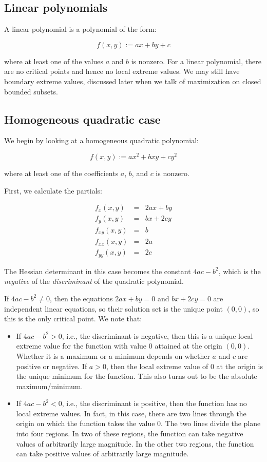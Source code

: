 \documentclass[10pt]{amsart}
\begin{document}
\subsection{Linear polynomials}

A linear polynomial is a polynomial of the form:

$$f(x,y) := ax + by + c$$

where at least one of the values $a$ and $b$ is nonzero. For a linear
polynomial, there are no critical points and hence no local extreme
values. We may still have boundary extreme values, discussed later
when we talk of maximization on closed bounded subsets.

\subsection{Homogeneous quadratic case}

We begin by looking at a homogeneous quadratic polynomial:

$$f(x,y) := ax^2 + bxy + cy^2$$

where at least one of the coefficients $a$, $b$, and $c$ is nonzero.

First, we calculate the partials:

\begin{eqnarray*}
  f_x(x,y) & = & 2ax + by \\
  f_y(x,y) & = & bx + 2cy \\
  f_{xy}(x,y)&=& b\\
  f_{xx}(x,y)&=& 2a \\
  f_{yy}(x,y)&=& 2c
\end{eqnarray*}

The Hessian determinant in this case becomes the constant $4ac - b^2$,
which is the {\em negative} of the {\em discriminant} of the quadratic
polynomial.

If $4ac - b^2 \ne 0$, then the equations $2ax + by = 0$ and $bx + 2cy
= 0$ are independent linear equations, so their solution set is the
unique point $(0,0)$, so this is the only critical point. We note that:

\begin{itemize}
\item If $4ac - b^2 > 0$, i.e., the discriminant is negative, then
  this is a unique local extreme value for the function with value $0$
  attained at the origin $(0,0)$. Whether it is a maximum or a minimum
  depends on whether $a$ and $c$ are positive or negative. If $a > 0$,
  then the local extreme value of $0$ at the origin is the unique
  minimum for the function. This also turns out to be the absolute
  maximum/minimum.
\item If $4ac - b^2 < 0$, i.e., the discriminant is positive, then the
  function has no local extreme values. In fact, in this case, there
  are two lines through the origin on which the function takes the
  value $0$. The two lines divide the plane into four regions. In two
  of these regions, the function can take negative values of
  arbitrarily large magnitude. In the other two regions, the function
  can take positive values of arbitrarily large magnitude.
\end{itemize}
\end{document}

